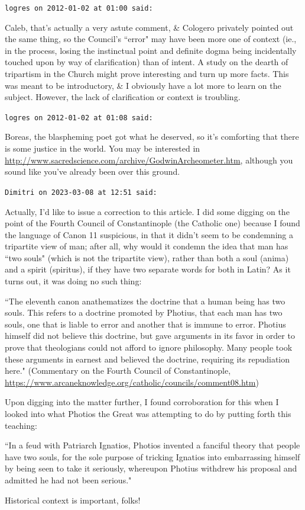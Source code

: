 \begin{footnotesize}
\begin{sffamily}
\hfill

\texttt{logres on 2012-01-02 at 01:00 said: }

Caleb, that's actually a very astute comment, \& Cologero privately pointed out the same thing, so the Council's ``error" may have been more one of context (ie., in the process, losing the instinctual point and definite dogma being incidentally touched upon by way of clarification) than of intent. A study on the dearth of tripartism in the Church might prove interesting and turn up more facts. This was meant to be introductory, \& I obviously have a lot more to learn on the subject. However, the lack of clarification or context is troubling.


\hfill

\texttt{logres on 2012-01-02 at 01:08 said: }

Boreas, the blaspheming poet got what he deserved, so it's comforting that there is some justice in the world. You may be interested in \url{http://www.sacredscience.com/archive/GodwinArcheometer.htm}, although you sound like you've already been over this ground.


\hfill

\texttt{Dimitri on 2023-03-08 at 12:51 said: }

Actually, I'd like to issue a correction to this article. I did some digging on the point of the Fourth Council of Constantinople (the Catholic one) because I found the language of Canon 11 suspicious, in that it didn't seem to be condemning a tripartite view of man; after all, why would it condemn the idea that man has ``two souls" (which is not the tripartite view), rather than both a soul (anima) and a spirit (spiritus), if they have two separate words for both in Latin? As it turns out, it was doing no such thing:

``The eleventh canon anathematizes the doctrine that a human being has two souls. This refers to a doctrine promoted by Photius, that each man has two souls, one that is liable to error and another that is immune to error. Photius himself did not believe this doctrine, but gave arguments in its favor in order to prove that theologians could not afford to ignore philosophy. Many people took these arguments in earnest and believed the doctrine, requiring its repudiation here." (Commentary on the Fourth Council of Constantinople, \url{https://www.arcaneknowledge.org/catholic/councils/comment08.htm})

Upon digging into the matter further, I found corroboration for this when I looked into what Photios the Great was attempting to do by putting forth this teaching:

``In a feud with Patriarch Ignatios, Photios invented a fanciful theory that people have two souls, for the sole purpose of tricking Ignatios into embarrassing himself by being seen to take it seriously, whereupon Photius withdrew his proposal and admitted he had not been serious."

Historical context is important, folks!


\hfill


\end{sffamily}\end{footnotesize}
